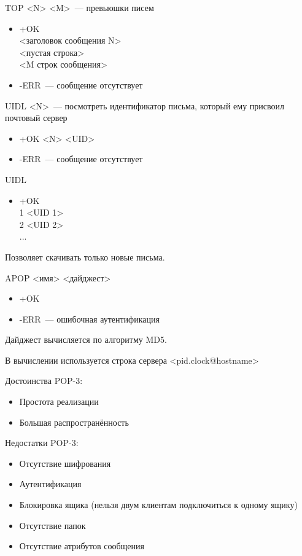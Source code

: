 TOP <N> <M>~--- превьюшки писем
\begin{itemize}
    \item +OK\\
    <заголовок сообщения N>\\
    <пустая строка>\\
    <M строк сообщения>
    \item -ERR~--- сообщение отсутствует
\end{itemize} 

UIDL <N>~--- посмотреть идентификатор письма, который ему присвоил почтовый сервер
\begin{itemize}
    \item +OK <N> <UID>
    \item -ERR~--- сообщение отсутствует
\end{itemize} 

UIDL
\begin{itemize}
    \item +OK\\
    1 <UID 1>\\
    2 <UID 2>\\
    ...
\end{itemize} 

Позволяет скачивать только новые письма.

APOP <имя> <дайджест>
\begin{itemize}
    \item +OK
    \item -ERR~--- ошибочная аутентификация
\end{itemize} 

Дайджест вычисляется по алгоритму MD5.

В вычислении используется строка сервера <pid.clock@hostname>

Достоинства POP-3:
\begin{itemize}
    \item Простота реализации
    \item Большая распространённость
\end{itemize}

Недостатки POP-3:
\begin{itemize}
    \item Отсутствие шифрования
    \item Аутентификация
    \item Блокировка ящика (нельзя двум клиентам подключиться к одному ящику)
    \item Отсутствие папок
    \item Отсутствие атрибутов сообщения
\end{itemize}


